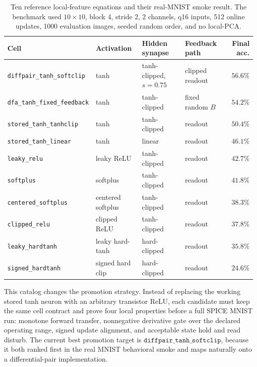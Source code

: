 \documentclass[11pt]{article}
\newcommand{\code}[1]{\texttt{#1}}
\begin{document}
\begin{table}[H]
  \centering
  \caption{Ten reference local-feature equations and their real-MNIST smoke
  result.  The benchmark used \(10\times10\), block 4, stride 2, 2 channels,
  q16 inputs, 512 online updates, 1000 evaluation images, seeded random order,
  and no local-PCA.}
  \label{tab:cell-catalog}
  \scriptsize
  \begin{tabular}{llllr}
    \toprule
    Cell & Activation & Hidden synapse & Feedback path & Final acc. \\
    \midrule
    \code{diffpair\_tanh\_softclip} & tanh & tanh-clipped, \(s=0.75\) & clipped readout & \(56.6\%\) \\
    \code{dfa\_tanh\_fixed\_feedback} & tanh & tanh-clipped & fixed random \(B\) & \(54.2\%\) \\
    \code{stored\_tanh\_tanhclip} & tanh & tanh-clipped & readout & \(50.4\%\) \\
    \code{stored\_tanh\_linear} & tanh & linear & readout & \(46.1\%\) \\
    \code{leaky\_relu} & leaky ReLU & tanh-clipped & readout & \(42.7\%\) \\
    \code{softplus} & softplus & tanh-clipped & readout & \(41.8\%\) \\
    \code{centered\_softplus} & centered softplus & tanh-clipped & readout & \(38.3\%\) \\
    \code{clipped\_relu} & clipped ReLU & tanh-clipped & readout & \(37.8\%\) \\
    \code{leaky\_hardtanh} & leaky hard-tanh & hard-clipped & readout & \(35.8\%\) \\
    \code{signed\_hardtanh} & signed hard clip & hard-clipped & readout & \(24.6\%\) \\
    \bottomrule
  \end{tabular}
\end{table}

This catalog changes the promotion strategy.  Instead of replacing the working
stored tanh neuron with an arbitrary transistor ReLU, each candidate must keep
the same cell contract and prove four local properties before a full SPICE
MNIST run: monotone forward transfer, nonnegative derivative gate over the
declared operating range, signed update alignment, and acceptable state hold
and read disturb.  The current best promotion target is
\(\code{diffpair\_tanh\_softclip}\), because it both ranked first in the real
MNIST behavioral smoke and maps naturally onto a differential-pair
implementation.
\end{document}
